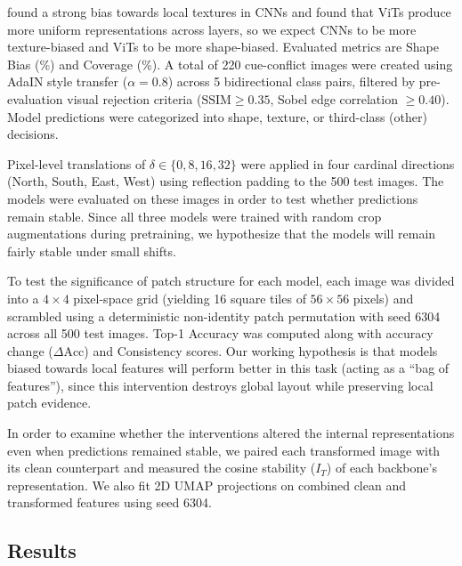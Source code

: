 \documentclass{article}
\begin{document}
\citet{geirhos2019imagenet} found a strong bias towards local textures in CNNs and \citet{raghu2021vision} found that ViTs produce more uniform representations across layers, so we expect CNNs to be more texture-biased and ViTs to be more shape-biased. Evaluated metrics are Shape Bias (\%) and Coverage (\%). A total of 220 cue-conflict images were created using AdaIN style transfer ($\alpha=0.8$) across 5 bidirectional class pairs, filtered by pre-evaluation visual rejection criteria ($\text{SSIM} \ge 0.35$, Sobel edge correlation $\ge 0.40$). Model predictions were categorized into shape, texture, or third-class (other) decisions.

Pixel-level translations of $\delta \in \{0, 8, 16, 32\}$ were applied in four cardinal directions (North, South, East, West) using reflection padding to the 500 test images. The models were evaluated on these images in order to test whether predictions remain stable. Since all three models were trained with random crop augmentations during pretraining, we hypothesize that the models will remain fairly stable under small shifts.

To test the significance of patch structure for each model, each image was divided into a $4 \times 4$ pixel-space grid (yielding 16 square tiles of $56 \times 56$ pixels) and scrambled using a deterministic non-identity patch permutation with seed 6304 across all 500 test images. Top-1 Accuracy was computed along with accuracy change ($\Delta \text{Acc}$) and Consistency scores. Our working hypothesis is that models biased towards local features will perform better in this task (acting as a ``bag of features''), since this intervention destroys global layout while preserving local patch evidence.

In order to examine whether the interventions altered the internal representations even when predictions remained stable, we paired each transformed image with its clean counterpart and measured the cosine stability ($I_T$) of each backbone's representation. We also fit 2D UMAP projections on combined clean and transformed features using seed 6304.

\subsection{Results}
\end{document}
